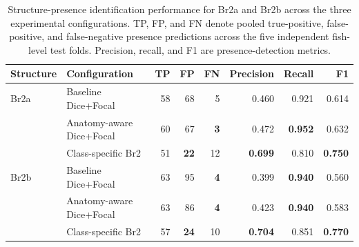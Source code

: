 \begin{table}[htbp]
\centering
\caption{Structure-presence identification performance for Br2a and Br2b across the three experimental configurations. TP, FP, and FN denote pooled true-positive, false-positive, and false-negative presence predictions across the five independent fish-level test folds. Precision, recall, and F1 are presence-detection metrics.}
\label{tab:br2_presence}
\small
\begin{tabularx}{\textwidth}{llrrrrrr}
\hline
\textbf{Structure} &
\textbf{Configuration} &
\textbf{TP} &
\textbf{FP} &
\textbf{FN} &
\textbf{Precision} &
\textbf{Recall} &
\textbf{F1} \\
\hline

Br2a &
Baseline Dice+Focal &
58 & 68 & 5 &
0.460 & 0.921 & 0.614 \\

 &
Anatomy-aware Dice+Focal &
60 & 67 & \textbf{3} &
0.472 & \textbf{0.952} & 0.632 \\

 &
Class-specific Br2 &
51 & \textbf{22} & 12 &
\textbf{0.699} & 0.810 & \textbf{0.750} \\

\hline

Br2b &
Baseline Dice+Focal &
63 & 95 & \textbf{4} &
0.399 & \textbf{0.940} & 0.560 \\

 &
Anatomy-aware Dice+Focal &
63 & 86 & \textbf{4} &
0.423 & \textbf{0.940} & 0.583 \\

 &
Class-specific Br2 &
57 & \textbf{24} & 10 &
\textbf{0.704} & 0.851 & \textbf{0.770} \\

\hline

\end{tabularx}
\end{table}
